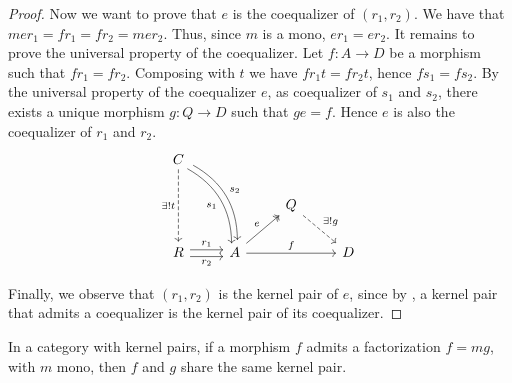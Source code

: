 \begin{subbox}{}
\begin{proof}
    Now we want to prove that $e$ is the coequalizer of $(r_1,r_2)$. We have that $mer_1=fr_1 = fr_2 = mer_2$. Thus, since $m$ is a mono, $er_1=er_2$. It remains to prove the universal property of the coequalizer. Let $f:A \to D$ be a morphism such that $fr_1=fr_2$. Composing with $t$ we have $fr_1t=fr_2t$, hence $fs_1=fs_2$. By the universal property of the coequalizer $e$, as coequalizer of $s_1$ and $s_2$, there exists a unique morphism $g:Q \to D$ such that $ge=f$. Hence $e$ is also the coequalizer of $r_1$ and $r_2$.
    \[
\begin{tikzcd}
    C \arrow[rdd, "s_2", bend left, shift left] \arrow[rdd, "s_1"', bend left, shift right] \arrow[dd, "\exists !  t"', dashed] &                                              &                                     &   \\
                                                                                                                                &                                              & Q \arrow[rd, "\exists ! g", dashed] &   \\
    R \arrow[r, "r_2"', shift right] \arrow[r, "r_1", shift left]                                                               & A \arrow[rr, "f"] \arrow[ru, "e", two heads] &                                     & D
    \end{tikzcd}
    \]

    Finally, we observe that $(r_1,r_2)$ is the kernel pair of $e$, since by , a kernel pair that admits a coequalizer is the kernel pair of its coequalizer.
\end{proof}
\end{subbox}


\begin{mainbox}{}
    \begin{prop}\label{f and e share the kernel pair}
        In a category with kernel pairs, if a morphism $f$ admits a factorization $f=mg$, with $m$ mono, then $f$ and $g$ share the same kernel pair.
    \end{prop}
\end{mainbox}

